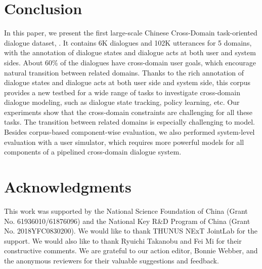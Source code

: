 \section{Conclusion}
In this paper, we present the first large-scale Chinese Cross-Domain task-oriented dialogue dataset, \textbf{\datasetName}. 
It contains 6K dialogues and 102K utterances for 5 domains, with the annotation of dialogue states and dialogue acts at both user and system sides.
About 60\% of the dialogues have cross-domain user goals, which encourage natural transition between related domains.
Thanks to the rich annotation of dialogue states and dialogue acts at both user side and system side, this corpus provides a new testbed for a wide range of tasks to investigate cross-domain dialogue modeling, such as dialogue state tracking, policy learning, etc.
Our experiments show that the cross-domain constraints are challenging for all these tasks. The transition between related domains is especially challenging to model.
Besides corpus-based component-wise evaluation, we also performed system-level evaluation with a user simulator, which requires more powerful models for all components of a pipelined cross-domain dialogue system.

\section*{Acknowledgments}
This work was supported by the National Science Foundation of China (Grant No. 61936010/61876096) and the National Key R\&D Program of China (Grant No. 2018YFC0830200). 
We would like to thank THUNUS NExT JointLab for the support. 
We would also like to thank Ryuichi Takanobu and Fei Mi for their constructive comments. We are grateful to our action editor, Bonnie Webber, and the anonymous reviewers for their valuable suggestions and feedback.

